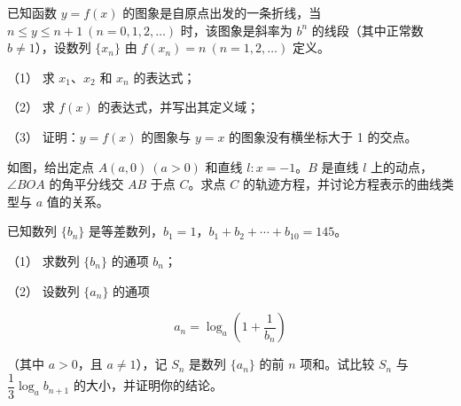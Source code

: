\begin{question}
已知函数 $y=f(x)$ 的图象是自原点出发的一条折线，当 $n\le y\le n+1\ (n=0,1,2,\ldots)$ 时，该图象是斜率为 $b^n$ 的线段（其中正常数 $b\ne1$），设数列 $\{x_n\}$ 由 $f(x_n)=n\ (n=1,2,\ldots)$ 定义。

（1） 求 $x_1$、$x_2$ 和 $x_n$ 的表达式；

（2） 求 $f(x)$ 的表达式，并写出其定义域；

（3） 证明：$y=f(x)$ 的图象与 $y=x$ 的图象没有横坐标大于 1 的交点。

\Needspace{0.4\textheight}
\end{question}
\begin{question}
如图，给出定点 $A(a,0)\ (a>0)$ 和直线 $l:x=-1$。$B$ 是直线 $l$ 上的动点，$\angle BOA$ 的角平分线交 $AB$ 于点 $C$。求点 $C$ 的轨迹方程，并讨论方程表示的曲线类型与 $a$ 值的关系。
\nopagebreak[4]
\begin{center}\end{center}
\nopagebreak[4]
\end{question}
\begin{question}
已知数列 $\{b_n\}$ 是等差数列，$b_1=1$，$b_1+b_2+\cdots+b_{10}=145$。

（1） 求数列 $\{b_n\}$ 的通项 $b_n$；

（2） 设数列 $\{a_n\}$ 的通项

\nopagebreak[4]
\[
a_n=\log_a\left(1+\frac1{b_n}\right)
\]

（其中 $a>0$，且 $a\ne1$），记 $S_n$ 是数列 $\{a_n\}$ 的前 $n$ 项和。试比较 $S_n$ 与 $\dfrac13\log_a b_{n+1}$ 的大小，并证明你的结论。

\end{question}